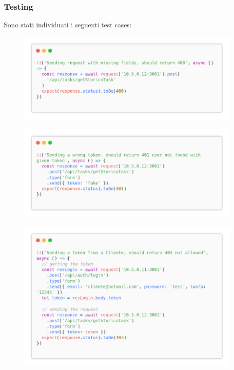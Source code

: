 \documentclass{report}
\begin{document}
\subsubsection*{Testing}

Sono stati individuati i seguenti test cases:
\begin{figure}[H]
	\centering\includegraphics[width=1\textwidth]{images/code_storico_test1.png}
\end{figure}
\begin{figure}[H]
	\centering\includegraphics[width=1\textwidth]{images/code_storico_test2.png}
\end{figure}
\begin{figure}[H]
	\centering\includegraphics[width=1\textwidth]{images/code_storico_test3.png}
\end{figure}
\end{document}
